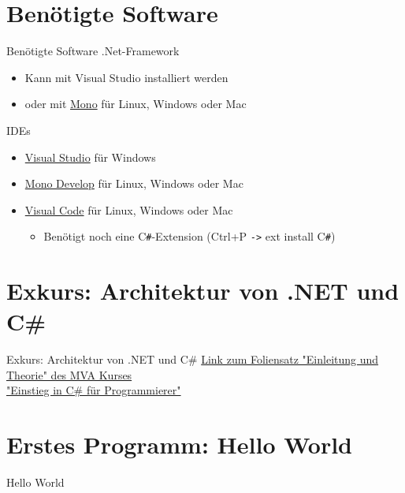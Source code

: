 \section{Benötigte Software}
\begin{frame}{Benötigte Software}
	.Net-Framework
	\begin{itemize}
		\item Kann mit Visual Studio installiert werden
		\item oder mit \href{http://www.mono-project.com/}{Mono} für Linux, Windows oder Mac
	\end{itemize}
	IDEs
	\begin{itemize}
		\item \href{https://www.visualstudio.com/}{Visual Studio} für Windows
		\item \href{http://www.monodevelop.com/}{Mono Develop} für Linux, Windows oder Mac
		\item \href{https://www.visualstudio.com/de-de/products/code-vs.aspx}{Visual Code} für Linux, Windows oder Mac
		\begin{itemize}
			\item Benötigt noch eine C\texttt{\#}-Extension (Ctrl+P \texttt{->} ext install C\texttt{\#})
		\end{itemize}
	\end{itemize}
\end{frame}

\section[Exkurs: \newline Architektur von .NET und C\#]{Exkurs:  Architektur von .NET und C\#}
\begin{frame}{Exkurs: Architektur von .NET und C\#}
	\centering
	\href{https://mva.microsoft.com/de-de/training-courses/einstieg-in-c-fr-programmierer-8826?l=MoyWcix2_1304984382}{Link zum Foliensatz "Einleitung und Theorie" des MVA Kurses \\"Einstieg in C\# für Programmierer"}
\end{frame} 
\section{Erstes Programm: Hello World}
\begin{frame}{Hello World}
       
\end{frame} 

